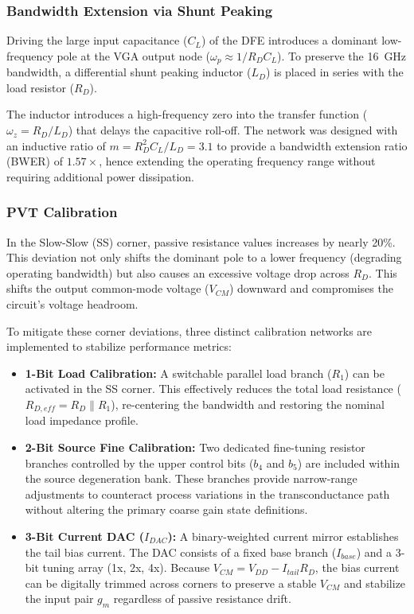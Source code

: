\subsubsection*{Bandwidth Extension via Shunt Peaking}
Driving the large input capacitance ($C_L$) of the DFE introduces a dominant low-frequency pole at the VGA output node ($\omega_p \approx 1 / R_D C_L$). To preserve the 16~GHz bandwidth, a differential shunt peaking inductor ($L_D$) is placed in series with the load resistor ($R_D$). 

The inductor introduces a high-frequency zero into the transfer function ($\omega_z = R_D / L_D$) that delays the capacitive roll-off. The network was designed with an inductive ratio of $m = R_D^2 C_L / L_D = 3.1$ to provide a bandwidth extension ratio (BWER) of $1.57\times$, hence extending the operating frequency range without requiring additional power dissipation.

\subsubsection*{PVT Calibration}
In the Slow-Slow (SS) corner, passive resistance values increases by nearly 20\%. This deviation not only shifts the dominant pole to a lower frequency (degrading operating bandwidth) but also causes an excessive voltage drop across $R_D$. This shifts the output common-mode voltage ($V_{CM}$) downward and compromises the circuit's voltage headroom. 

To mitigate these corner deviations, three distinct calibration networks are implemented to stabilize performance metrics:
\begin{itemize}
    \item \textbf{1-Bit Load Calibration:} A switchable parallel load branch ($R_1$) can be activated in the SS corner. This effectively reduces the total load resistance ($R_{D,eff} = R_D \parallel R_1$), re-centering the bandwidth and restoring the nominal load impedance profile.
    \item \textbf{2-Bit Source Fine Calibration:} Two dedicated fine-tuning resistor branches controlled by the upper control bits ($b_4$ and $b_5$) are included within the source degeneration bank. These branches provide narrow-range adjustments to counteract process variations in the transconductance path without altering the primary coarse gain state definitions.
    \item \textbf{3-Bit Current DAC ($I_{DAC}$):} A binary-weighted current mirror establishes the tail bias current. The DAC consists of a fixed base branch ($I_{base}$) and a 3-bit tuning array (1x, 2x, 4x). Because $V_{CM} = V_{DD} - I_{tail} R_D$, the bias current can be digitally trimmed across corners to preserve a stable $V_{CM}$ and stabilize the input pair $g_m$ regardless of passive resistance drift.
\end{itemize}

